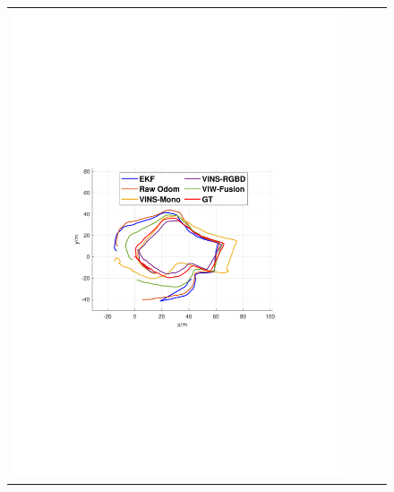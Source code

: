 \documentclass[conference]{IEEEtran}
\begin{document}
\begin{figure}
\begin{center}
\begin{tabular}{cccc}
				\includegraphics[scale=0.24]{fig/loop2.pdf}&

\end{tabular}
\end{center}
\end{figure}
\end{document}
